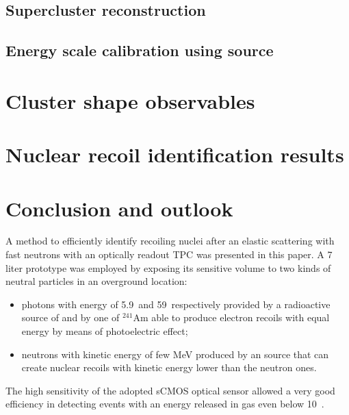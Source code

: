 \documentclass[12pt]{iopart}
\begin{document}
\subsection{Supercluster reconstruction}
\label{sec:supercl}


\clearpage

\subsection{Energy scale calibration using \fe source}
\label{sec:calibration}



\section{Cluster shape observables}
\label{sec:clustershapes}


 
\section{Nuclear recoil identification results}
\label{sec:results}

 
\clearpage


 \section{Conclusion and outlook}

A method to efficiently identify recoiling nuclei after an elastic
scattering with fast neutrons with an optically readout TPC was
presented in this paper.  A 7 liter prototype was employed by exposing
its sensitive volume to two kinds of neutral particles in an
overground location:
\begin{itemize}
\item photons with energy of 5.9~\keV and 59~\keV respectively
  provided by a radioactive source of \fe and by one of $^{241}$Am
  able to produce electron recoils with equal energy by means of
  photoelectric effect;
\item neutrons with kinetic energy of few MeV produced by an \ambe
  source that can create nuclear recoils with kinetic energy lower
  than the neutron ones.
\end{itemize}

The high sensitivity of the adopted sCMOS optical sensor allowed a
very good efficiency in detecting events with an energy released in
gas even below 10~\keV.
\end{document}
